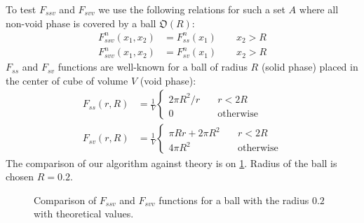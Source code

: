 \documentclass[1p]{elsarticle}
\begin{document}
To test $F_{ssv}$ and $F_{svv}$ we use the following relations for such a set
$A$ where all non-void phase is covered by a ball $\mathfrak{O}(R)$:
\begin{align}
  F^n_{ssv}(x_1, x_2) &= F^n_{ss}(x_1) \qquad x_2 > R \\
  F^n_{svv}(x_1, x_2) &= F^n_{sv}(x_1) \qquad x_2 > R
\end{align}
$F_{ss}$ and $F_{sv}$ functions are well-known for a ball of radius $R$ (solid
phase) placed in the center of cube of volume $V$ (void phase):
\begin{align}
  F_{ss}(r, R) &= \frac{1}{V} \left\{
    \begin{array}{ll}
      2\pi R^2/r & \quad r < 2R \\
      0 & \quad \text{otherwise}
    \end{array}
    \right.\\
  F_{sv}(r, R) &= \frac{1}{V} \left\{
    \begin{array}{ll}
      \pi Rr + 2\pi R^2 & \quad r < 2R \\
      4\pi R^2 & \quad \text{otherwise}
    \end{array}
    \right.
\end{align}
The comparison of our algorithm against theory is on
\cref{fig:surface-verification}. Radius of the ball is chosen $R=0.2$.
\begin{figure}[tp]
  \centering
  \hfill
  \caption[]{Comparison of $F_{ssv}$ and $F_{svv}$ functions for a ball with the
    radius $0.2$ with theoretical values.}
  \label{fig:surface-verification}
\end{figure}
\end{document}
